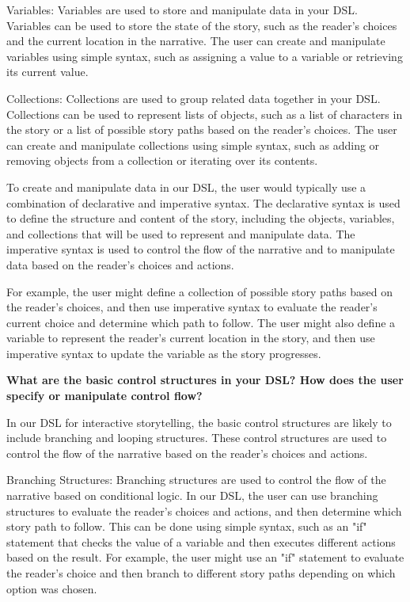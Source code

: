 Variables: Variables are used to store and manipulate data in your DSL. Variables can be used to store the state of the story, such as the reader's choices and the current location in the narrative. The user can create and manipulate variables using simple syntax, such as assigning a value to a variable or retrieving its current value.

Collections: Collections are used to group related data together in your DSL. Collections can be used to represent lists of objects, such as a list of characters in the story or a list of possible story paths based on the reader's choices. The user can create and manipulate collections using simple syntax, such as adding or removing objects from a collection or iterating over its contents.

To create and manipulate data in our DSL, the user would typically use a combination of declarative and imperative syntax. The declarative syntax is used to define the structure and content of the story, including the objects, variables, and collections that will be used to represent and manipulate data. The imperative syntax is used to control the flow of the narrative and to manipulate data based on the reader's choices and actions.

For example, the user might define a collection of possible story paths based on the reader's choices, and then use imperative syntax to evaluate the reader's current choice and determine which path to follow. The user might also define a variable to represent the reader's current location in the story, and then use imperative syntax to update the variable as the story progresses.

\textbf {What are the basic control structures in your DSL? How does the user specify or manipulate control flow?}

In our DSL for interactive storytelling, the basic control structures are likely to include branching and looping structures. These control structures are used to control the flow of the narrative based on the reader's choices and actions.

Branching Structures: Branching structures are used to control the flow of the narrative based on conditional logic. In our DSL, the user can use branching structures to evaluate the reader's choices and actions, and then determine which story path to follow. This can be done using simple syntax, such as an "if" statement that checks the value of a variable and then executes different actions based on the result. For example, the user might use an "if" statement to evaluate the reader's choice and then branch to different story paths depending on which option was chosen.

